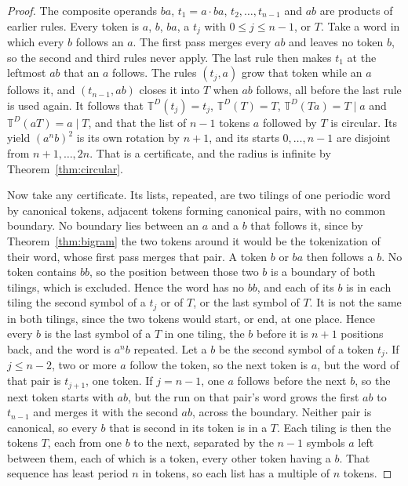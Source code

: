 \documentclass[11pt,a4paper]{article}
\theoremstyle{definition}
\theoremstyle{plain}
\newcommand{\T}{\mathbb{T}}
\begin{document}
\begin{proof}
The composite operands \(ba\), \(t_1 = a \cdot ba\), \(t_2, \dots, t_{n-1}\) and \(ab\) are products of earlier rules.
Every token is \(a\), \(b\), \(ba\), a \(t_j\) with \(0 \le j \le n - 1\), or \(T\). Take a word in which every \(b\)
follows an \(a\). The first pass merges every \(ab\) and leaves no token \(b\), so the second and third rules never
apply. The last rule then makes \(t_1\) at the leftmost \(ab\) that an \(a\) follows. The rules \((t_j, a)\) grow that
token while an \(a\) follows it, and \((t_{n-1}, ab)\) closes it into \(T\) when \(ab\) follows, all before the last
rule is used again. It follows that \(\T^D(t_j) = t_j\), \(\T^D(T) = T\), \(\T^D(Ta) = T \mid a\) and
\(\T^D(aT) = a \mid T\), and that the list of \(n - 1\) tokens \(a\) followed by \(T\) is circular. Its yield
\((a^n b)^2\) is its own rotation by \(n + 1\), and its starts \(0, \dots, n - 1\) are disjoint from
\(n + 1, \dots, 2n\). That is a certificate, and the radius is infinite by Theorem~\ref{thm:circular}.

Now take any certificate. Its lists, repeated, are two tilings of one periodic word by canonical tokens, adjacent tokens
forming canonical pairs, with no common boundary. No boundary lies between an \(a\) and a \(b\) that follows it, since
by Theorem~\ref{thm:bigram} the two tokens around it would be the tokenization of their word, whose first pass merges
that pair. A token \(b\) or \(ba\) then follows a \(b\). No token contains \(bb\), so the position between those two
\(b\) is a boundary of both tilings, which is excluded. Hence the word has no \(bb\), and each of its \(b\) is in each
tiling the second symbol of a \(t_j\) or of \(T\), or the last symbol of \(T\). It is not the same in both tilings,
since the two tokens would start, or end, at one place. Hence every \(b\) is the last symbol of a \(T\) in one tiling,
the \(b\) before it is \(n + 1\) positions back, and the word is \(a^n b\) repeated. Let a \(b\) be the second symbol of
a token \(t_j\). If \(j \le n - 2\), two or more \(a\) follow the token, so the next token is \(a\), but the word of
that pair is \(t_{j+1}\), one token. If \(j = n - 1\), one \(a\) follows before the next \(b\), so the next token starts
with \(ab\), but the run on that pair's word grows the first \(ab\) to \(t_{n-1}\) and merges it with the second \(ab\),
across the boundary. Neither pair is canonical, so every \(b\) that is second in its token is in a \(T\). Each tiling is
then the tokens \(T\), each from one \(b\) to the next, separated by the \(n - 1\) symbols \(a\) left between them, each
of which is a token, every other token having a \(b\). That sequence has least period \(n\) in tokens, so each list has
a multiple of \(n\) tokens.
\end{proof}
\end{document}
